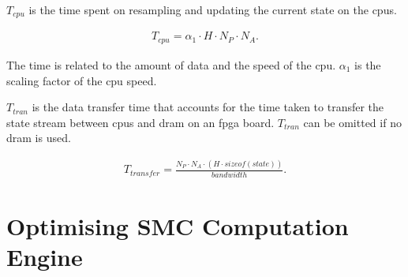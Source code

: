 $T_{cpu}$ is the time spent on resampling and updating the current state on the \glspl{cpu}.

\begin{equation}
\begin{aligned}
T_{cpu} = \alpha_1 \cdot H \cdot N_P \cdot N_A \mbox{.}
\end{aligned}
\end{equation}

The time is related to the amount of data and the speed of the \gls{cpu}.
$\alpha_1$ is the scaling factor of the \gls{cpu} speed.

$T_{tran}$ is the data transfer time that accounts for the time taken to transfer the state stream between \glspl{cpu} and \gls{dram} on an \gls{fpga} board.
$T_{tran}$ can be omitted if no \gls{dram} is used.

\begin{equation}
\begin{aligned}
T_{transfer} = \frac{N_P \cdot N_A \cdot \left ( H \cdot sizeof(state)\right)}{bandwidth} \mbox{.}
\end{aligned}
\end{equation}




\section{Optimising SMC Computation Engine}
\label{sec:flow_optimisation}


